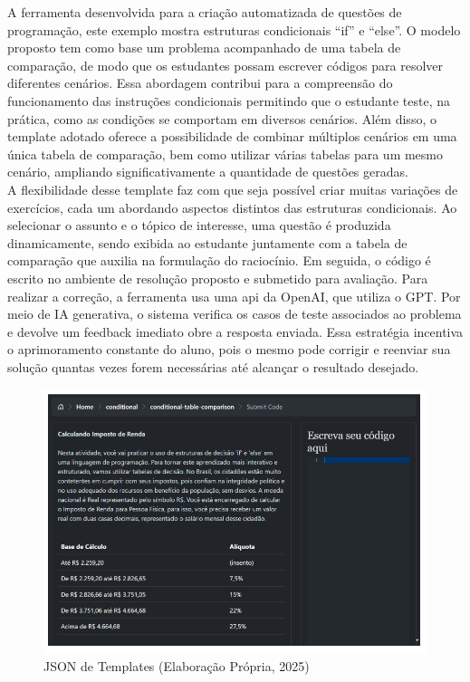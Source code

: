 A ferramenta desenvolvida para a criação automatizada de questões de programação, este exemplo mostra estruturas condicionais “if” e “else”. O modelo proposto  tem como base um problema acompanhado de uma tabela de comparação, de modo que os estudantes possam escrever códigos para resolver diferentes cenários. Essa abordagem contribui para a compreensão do funcionamento das instruções condicionais permitindo que o estudante teste, na prática, como as condições se comportam em diversos cenários. Além disso, o template adotado oferece a possibilidade de combinar múltiplos cenários em uma única tabela de comparação, bem como utilizar várias tabelas para um mesmo cenário, ampliando significativamente a quantidade de questões geradas. 
\\
A flexibilidade desse template faz com que seja possível criar muitas variações de exercícios, cada um abordando aspectos distintos das estruturas condicionais. Ao selecionar o assunto e o tópico de interesse, uma questão é produzida dinamicamente, sendo exibida ao estudante juntamente com a tabela de comparação que auxilia na formulação do raciocínio. Em seguida, o código é escrito no ambiente de resolução proposto e submetido para avaliação. Para realizar a correção, a ferramenta usa uma \gls{api} da OpenAI, que utiliza o GPT. Por meio de IA generativa, o sistema verifica os casos de teste associados ao problema e devolve um feedback imediato obre a resposta enviada. Essa estratégia incentiva o aprimoramento constante do aluno, pois o mesmo pode corrigir e reenviar sua solução quantas vezes forem necessárias até alcançar o resultado desejado. 

\begin{figure}[ht]
	\centering
	\includegraphics[width=17cm]{./imagens/capitulo7/ferramenta}
	\caption{JSON de Templates (Elaboração Própria, 2025) }
	\label{fig:ferramenta}
\end{figure}

